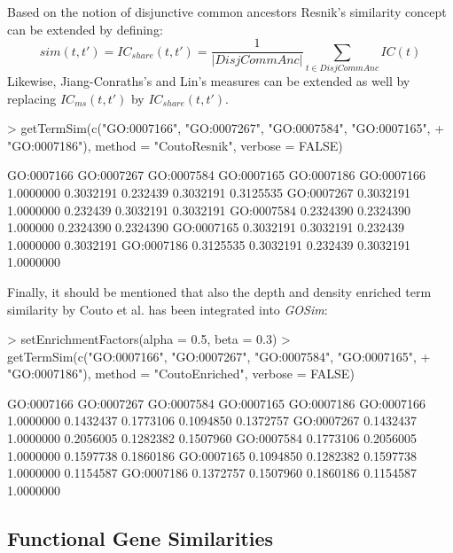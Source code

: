 \documentclass[12pt,a4paper]{article}
\begin{document}
Based on the notion of disjunctive common ancestors Resnik's similarity concept can be extended by defining:
\begin{equation}
sim(t,t') = IC_{share}(t,t') = \frac{1}{|DisjCommAnc|}\sum_{t\in DisjCommAnc} IC(t)
\end{equation}
Likewise, Jiang-Conraths's and Lin's measures can be extended as well by replacing $IC_{ms}(t,t')$ by $IC_{share}(t,t')$.
\begin{Schunk}
\begin{Sinput}
> getTermSim(c("GO:0007166", "GO:0007267", "GO:0007584", "GO:0007165", 
+     "GO:0007186"), method = "CoutoResnik", verbose = FALSE)
\end{Sinput}
\begin{Soutput}
           GO:0007166 GO:0007267 GO:0007584 GO:0007165 GO:0007186
GO:0007166  1.0000000  0.3032191   0.232439  0.3032191  0.3125535
GO:0007267  0.3032191  1.0000000   0.232439  0.3032191  0.3032191
GO:0007584  0.2324390  0.2324390   1.000000  0.2324390  0.2324390
GO:0007165  0.3032191  0.3032191   0.232439  1.0000000  0.3032191
GO:0007186  0.3125535  0.3032191   0.232439  0.3032191  1.0000000
\end{Soutput}
\end{Schunk}

Finally, it should be mentioned that also the depth and density enriched term similarity by Couto et al. \cite{Couto2003FuSSiMeg} has been integrated into \emph{GOSim}:
\begin{Schunk}
\begin{Sinput}
> setEnrichmentFactors(alpha = 0.5, beta = 0.3)
> getTermSim(c("GO:0007166", "GO:0007267", "GO:0007584", "GO:0007165", 
+     "GO:0007186"), method = "CoutoEnriched", verbose = FALSE)
\end{Sinput}
\begin{Soutput}
           GO:0007166 GO:0007267 GO:0007584 GO:0007165 GO:0007186
GO:0007166  1.0000000  0.1432437  0.1773106  0.1094850  0.1372757
GO:0007267  0.1432437  1.0000000  0.2056005  0.1282382  0.1507960
GO:0007584  0.1773106  0.2056005  1.0000000  0.1597738  0.1860186
GO:0007165  0.1094850  0.1282382  0.1597738  1.0000000  0.1154587
GO:0007186  0.1372757  0.1507960  0.1860186  0.1154587  1.0000000
\end{Soutput}
\end{Schunk}

\subsection{Functional Gene Similarities}
\end{document}
